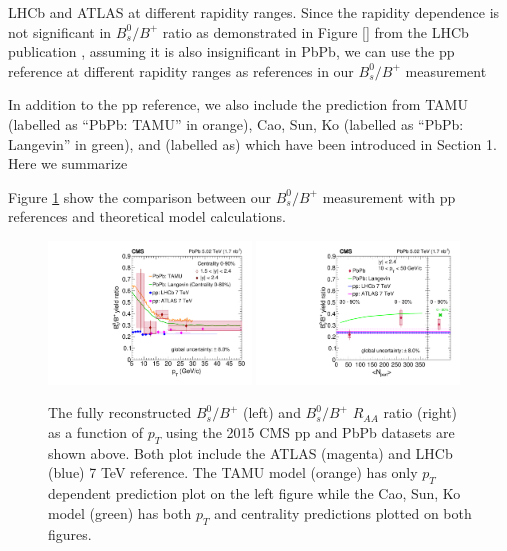 LHCb and ATLAS at different rapidity ranges. Since the rapidity dependence is not significant in $B^0_s/B^+$ ratio as demonstrated in Figure \ref{} from the LHCb publication \cite{LHCbFF}, assuming it is also insignificant in PbPb, we can use the pp reference at different rapidity ranges as references in our $B^0_s/B^+$ measurement

In addition to the pp reference, we also include the prediction from TAMU (labelled as ``PbPb: TAMU'' in orange), Cao, Sun, Ko (labelled as ``PbPb: Langevin'' in green), and (labelled as) which have been introduced in Section 1. Here we summarize 

Figure \ref{FinalResults} show the comparison between our $B^0_s/B^+$ measurement with pp references and theoretical model calculations. 

\begin{figure}[hbtp]
\begin{center}
\includegraphics[width=0.48\textwidth]{Figures/Chapter6/ratio_vsPt_ref1_1.pdf}
\includegraphics[width=0.48\textwidth]{Figures/Chapter6/ratio_vsCent_ref1.pdf}
\caption{The fully reconstructed $B^0_s/B^+$ (left) and $B^0_s/B^+$ $R_{AA}$ ratio (right) as a function of $p_T$ using the 2015 CMS pp and PbPb datasets are shown above. Both plot include the ATLAS (magenta) and LHCb (blue) 7 TeV reference. The TAMU model (orange) has only $p_T$ dependent prediction plot on the left figure while the Cao, Sun, Ko model (green) has both $p_T$ and centrality predictions plotted on both figures.}
\label{FinalResults}
\end{center}
\end{figure}   
 

